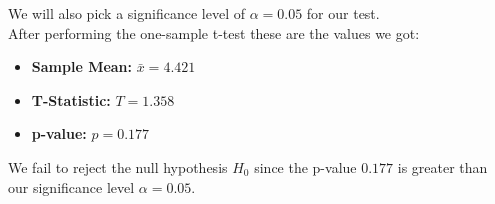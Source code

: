 \documentclass[a4paper, 10pt]{article}
\begin{document}
			\noindent We will also pick a significance level of \( \alpha = 0.05 \) for our test. \\

			After performing the one-sample t-test these are the values we got:
			\begin{itemize}
				\item \textbf{Sample Mean:} \( \bar{x} = 4.421 \)
				\item \textbf{T-Statistic:} \( T = 1.358 \)
				\item \textbf{p-value:} \( p = 0.177 \)
			\end{itemize}

			\noindent We fail to reject the null hypothesis $H_0$ since the p-value \( 0.177 \) is greater than our 
			significance level \( \alpha = 0.05 \). \\
\end{document}
